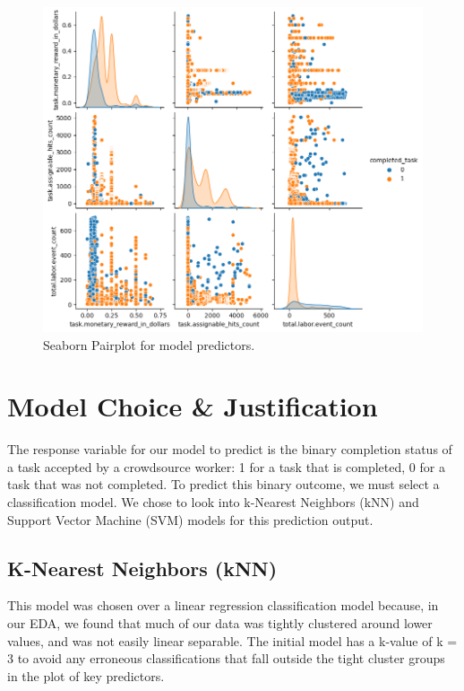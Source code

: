 \documentclass[11pt]{article}
\begin{document}
\begin{figure}[hbt!]
  \centering
  \includegraphics[width=\linewidth]{figures/sns-pairplot}
  \caption{Seaborn Pairplot for model predictors.}
\end{figure}

\section{Model Choice \& Justification}

The response variable for our model to predict is the binary completion status of a task accepted by a crowdsource worker: 1 for a task that is completed, 0 for a task that was not completed. To predict this binary outcome, we must select a classification model. We chose to look into k-Nearest Neighbors (kNN) and Support Vector Machine (SVM) models for this prediction output.

\subsection{K-Nearest Neighbors (kNN)}
This model was chosen over a linear regression classification model because, in our EDA, we found that much of our data was tightly clustered around lower values, and was not easily linear separable. The initial model has a k-value of k = 3 to avoid any erroneous classifications that fall outside the tight cluster groups in the plot of key predictors.

\end{document}
